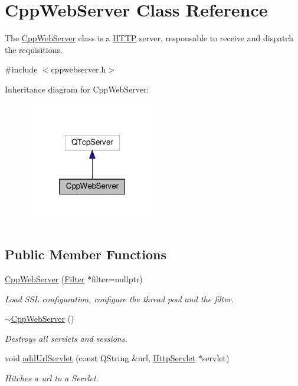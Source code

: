 \hypertarget{class_cpp_web_server}{}\section{Cpp\+Web\+Server Class Reference}
\label{class_cpp_web_server}


The \hyperlink{class_cpp_web_server}{Cpp\+Web\+Server} class is a \hyperlink{namespace_h_t_t_p}{H\+T\+TP} server, responsable to receive and dispatch the requisitions.  




{\ttfamily \#include $<$cppwebserver.\+h$>$}



Inheritance diagram for Cpp\+Web\+Server\+:\nopagebreak
\begin{figure}[H]
\begin{center}
\leavevmode
\includegraphics[width=163pt]{class_cpp_web_server__inherit__graph}
\end{center}
\end{figure}
\subsection*{Public Member Functions}
\begin{DoxyCompactItemize}
\item 
\hyperlink{class_cpp_web_server_a7cfe4db08561ebe79168d8b638a6cd7f}{Cpp\+Web\+Server} (\hyperlink{class_filter}{Filter} $\ast$filter=nullptr)
\begin{DoxyCompactList}\small\item\em Load S\+SL configuration, configure the thread pool and the filter. \end{DoxyCompactList}\item 
\hyperlink{class_cpp_web_server_a6b9d6874d16f6491c511fb4b8793a5f8}{$\sim$\+Cpp\+Web\+Server} ()
\begin{DoxyCompactList}\small\item\em Destroys all servlets and sessions. \end{DoxyCompactList}\item 
void \hyperlink{class_cpp_web_server_ae94dcf116776b97ec7d5a00cde87c6bd}{add\+Url\+Servlet} (const Q\+String \&url, \hyperlink{class_http_servlet}{Http\+Servlet} $\ast$servlet)
\begin{DoxyCompactList}\small\item\em Hitches a url to a Servlet. \end{DoxyCompactList}\end{DoxyCompactItemize}


